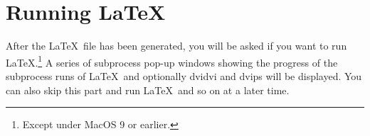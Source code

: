 \section{Running \LaTeX}

After the \LaTeX\ file has been generated, you will be asked if you want
to run \LaTeX.\footnote{Except under MacOS 9 or earlier.}  A series of
subprocess pop-up windows showing the progress of the subprocess runs of
\LaTeX\ and optionally dvidvi and dvips will be displayed.  You can also
skip this part and run \LaTeX\ and so on at a later time.



